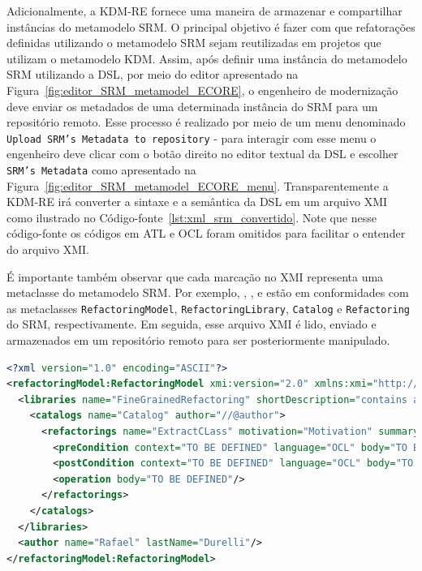 Adicionalmente, a KDM-RE fornece uma maneira de armazenar e compartilhar instâncias do metamodelo SRM. O principal objetivo é fazer com que refatorações definidas utilizando o metamodelo SRM sejam reutilizadas em projetos que utilizam o metamodelo KDM. Assim, após definir uma instância do metamodelo SRM utilizando a DSL, por meio do editor apresentado na Figura~\ref{fig:editor_SRM_metamodel_ECORE}, o engenheiro de modernização deve enviar os metadados de uma determinada instância do SRM para um repositório remoto. Esse processo é realizado por meio de um menu denominado \texttt{Upload SRM's Metadata to repository} - para interagir com esse menu o engenheiro deve clicar com o botão direito no editor textual da DSL e escolher \texttt{SRM's Metadata} como apresentado na Figura~\ref{fig:editor_SRM_metamodel_ECORE_menu}. Transparentemente a KDM-RE irá converter a sintaxe e a semântica da DSL em um arquivo XMI como ilustrado no Código-fonte~\ref{lst:xml_srm_convertido}. Note que nesse código-fonte os códigos em ATL e OCL foram omitidos para facilitar o entender do arquivo XMI. 

É importante também observar que cada marcação no XMI representa uma metaclasse do metamodelo SRM. Por exemplo, , ,  e  estão em conformidades com as metaclasses \texttt{RefactoringModel}, \texttt{RefactoringLibrary}, \texttt{Catalog} e \texttt{Refactoring} do SRM, respectivamente. Em seguida, esse arquivo XMI é lido, enviado e armazenados em um repositório remoto para ser posteriormente manipulado. 

\begin{lstlisting}[language=XML, frame=single, basicstyle={\scriptsize}, mathescape=true, label={lst:xml_srm_convertido}, caption={Arquivo XMI representando a instância do SRM.}]
<?xml version="1.0" encoding="ASCII"?>
<refactoringModel:RefactoringModel xmi:version="2.0" xmlns:xmi="http://www.omg.org/XMI" xmlns:xsi="http://www.w3.org/2001/XMLSchema-instance" xmlns:refactoringModel="http://refactoringModel/1.0">
  <libraries name="FineGrainedRefactoring" shortDescription="contains a set of refactorings" description="refactorings">
    <catalogs name="Catalog" author="//@author">
      <refactorings name="ExtractCLass" motivation="Motivation" summary="Summary">
        <preCondition context="TO BE DEFINED" language="OCL" body="TO BE DEFINED"/>
        <postCondition context="TO BE DEFINED" language="OCL" body="TO BE DEFINED"/>
        <operation body="TO BE DEFINED"/>
      </refactorings>
    </catalogs>
  </libraries>
  <author name="Rafael" lastName="Durelli"/>
</refactoringModel:RefactoringModel>
\end{lstlisting}


